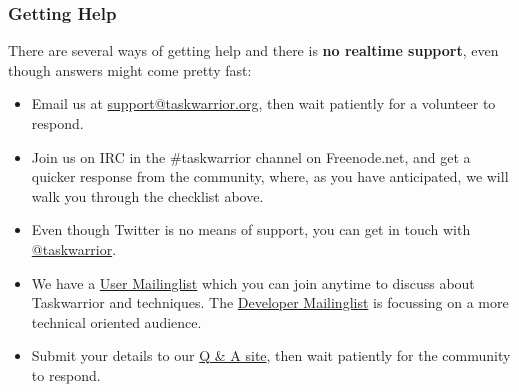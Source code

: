 \documentclass[t,handout]{beamer}
\begin{document}
\begin{frame}[fragile]\frametitle{Getting Help}
    \vfill
    There are several ways of getting help and there is \textbf{no realtime support}, even though answers might come pretty fast:

    \begin{itemize}
        \item Email us at \href{mailto:support@taskwarrior.org}{support@taskwarrior.org}, then wait patiently for a volunteer to respond.
        \item Join us on IRC in the \#taskwarrior channel on Freenode.net, and get a quicker response from the community, where, as you have anticipated, we will walk you through the checklist above.
        \item Even though Twitter is no means of support, you can get in touch with \href{https://twitter.com/taskwarrior}{@taskwarrior}.
        \item We have a \href{https://groups.google.com/forum/\#!forum/taskwarrior-user}{User Mailinglist} which you can join anytime to discuss about Taskwarrior and techniques. The \href{https://groups.google.com/forum/\#!forum/taskwarrior-dev}{Developer Mailinglist} is focussing on a more technical oriented audience.
        \item Submit your details to our \href{https://answers.tasktools.org}{Q \& A site}, then wait patiently for the community to respond.
    \end{itemize}
\end{frame}

\end{document}
